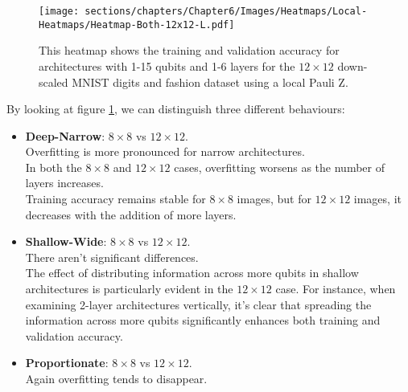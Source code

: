 \begin{figure}[h]
    \centering
    \texttt{[image: sections/chapters/Chapter6/Images/Heatmaps/Local-Heatmaps/Heatmap-Both-12x12-L.pdf]}
    \caption{This heatmap shows the training and validation accuracy for architectures with 1-15 qubits and
    1-6 layers for the $12\times12$ down-scaled MNIST digits and fashion dataset using a local Pauli Z.}
    \label{fig:heatmap-12x12-L}
\end{figure}

By looking at figure \ref{fig:heatmap-12x12-L}, we can distinguish 
three different behaviours:

\begin{itemize}
    \item \textbf{Deep-Narrow}: $8 \times 8$ vs $12 \times 12$.\\
    Overfitting is more pronounced for narrow architectures.\\
    In both the $8 \times 8$ and $12 \times 12$ cases, overfitting worsens as the number of layers increases. \\
    Training accuracy remains stable for $8 \times 8$ images, but for $12 \times 12$ images, 
    it decreases with the addition of more layers.
    \item \textbf{Shallow-Wide}: $8 \times 8$ vs $12 \times 12$.\\
    There aren't significant differences.\\
    The effect of distributing information across more qubits in shallow architectures is particularly 
    evident in the $12 \times 12$ case. For instance, when examining 2-layer architectures vertically, 
    it's clear that spreading the information across more qubits significantly enhances both training and 
    validation accuracy.
    \item \textbf{Proportionate}: $8 \times 8$ vs $12 \times 12$.\\
    Again overfitting tends to disappear. \\
 \end{itemize}
